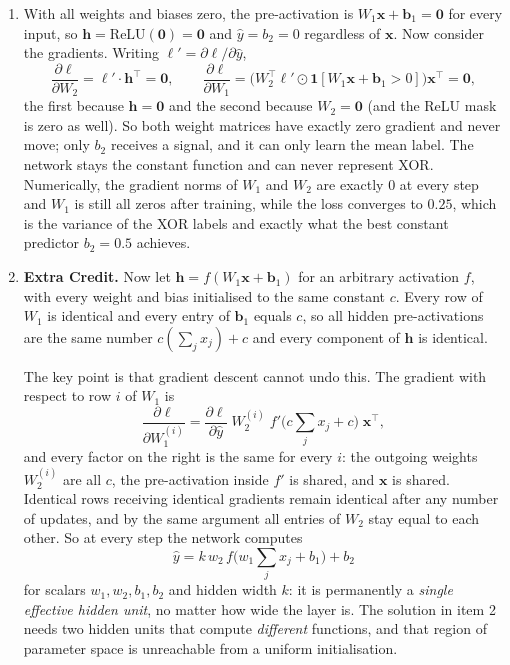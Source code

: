 \documentclass[11pt]{article}
\begin{document}
\begin{enumerate}
  \item With all weights and biases zero, the pre-activation is
        $W_1\mathbf{x} + \mathbf{b}_1 = \mathbf{0}$ for every input, so
        $\mathbf{h} = \mathrm{ReLU}(\mathbf{0}) = \mathbf{0}$ and $\hat{y} = b_2 = 0$ regardless of
        $\mathbf{x}$. Now consider the gradients. Writing $\ell' = \partial \ell / \partial \hat{y}$,
        \[
          \frac{\partial \ell}{\partial W_2} = \ell' \cdot \mathbf{h}^\top = \mathbf{0},
          \qquad
          \frac{\partial \ell}{\partial W_1}
            = \big(W_2^\top \ell' \odot \mathbf{1}[W_1\mathbf{x} + \mathbf{b}_1 > 0]\big)\mathbf{x}^\top
            = \mathbf{0},
        \]
        the first because $\mathbf{h} = \mathbf{0}$ and the second because $W_2 = \mathbf{0}$ (and the ReLU
        mask is zero as well). So both weight matrices have exactly zero gradient and never move; only
        $b_2$ receives a signal, and it can only learn the mean label. The network stays the constant
        function and can never represent XOR. Numerically, the gradient norms of $W_1$ and $W_2$ are
        exactly $0$ at every step and $W_1$ is still all zeros after training, while the loss converges to
        $0.25$, which is the variance of the XOR labels and exactly what the best constant predictor
        $b_2 = 0.5$ achieves.

  \item \textbf{Extra Credit.} Now let $\mathbf{h} = f(W_1\mathbf{x} + \mathbf{b}_1)$ for an arbitrary
        activation $f$, with every weight and bias initialised to the same constant $c$. Every row of
        $W_1$ is identical and every entry of $\mathbf{b}_1$ equals $c$, so all hidden pre-activations are
        the same number $c\left(\sum_j x_j\right) + c$ and every component of $\mathbf{h}$ is identical.

        The key point is that gradient descent cannot undo this. The gradient with respect to row $i$ of
        $W_1$ is
        \[
          \frac{\partial \ell}{\partial W_1^{(i)}}
            = \frac{\partial \ell}{\partial \hat{y}}\; W_{2}^{(i)}\; f'\big(c\textstyle\sum_j x_j + c\big)\;
              \mathbf{x}^\top ,
        \]
        and every factor on the right is the same for every $i$: the outgoing weights $W_2^{(i)}$ are all
        $c$, the pre-activation inside $f'$ is shared, and $\mathbf{x}$ is shared. Identical rows receiving
        identical gradients remain identical after any number of updates, and by the same argument all
        entries of $W_2$ stay equal to each other. So at every step the network computes
        \[
          \hat{y} = k\,w_2\, f\!\big(w_1 \textstyle\sum_j x_j + b_1\big) + b_2
        \]
        for scalars $w_1, w_2, b_1, b_2$ and hidden width $k$: it is permanently a \emph{single effective
        hidden unit}, no matter how wide the layer is. The solution in item 2 needs two hidden units that
        compute \emph{different} functions, and that region of parameter space is unreachable from a
        uniform initialisation.


\end{enumerate}
\end{document}
